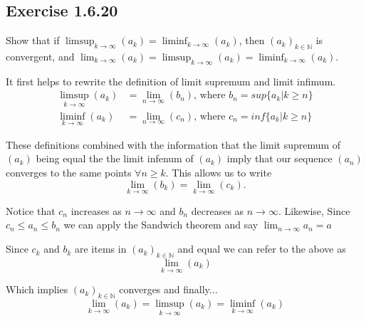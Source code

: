 \documentclass{tufte-book}
\theoremstyle{mytheoremstyle}
\theoremstyle{mylemstyle}
\theoremstyle{mydefstyle}
\begin{document}
\subsection{Exercise 1.6.20}
Show that if  $\limsup_{k \to \infty}(a_k) = \liminf_{k \to \infty}(a_k)$, then $(a_k)_{k \in \mathbb{N}}$ is convergent, and $\lim_{k \to \infty}(a_k) = \limsup_{k \to \infty}(a_k) = \liminf_{k \to \infty}(a_k)$.

It first helps to rewrite the definition of limit supremum and limit infimum.
\begin{align*}
	\limsup_{k \to \infty}(a_k) &= \lim_{n \to \infty}(b_n) \text{, where } b_n = sup\{a_k | k \geq n\} \\
    \liminf_{k \to \infty}(a_k) &= \lim_{n \to \infty}(c_n) \text{, where } c_n = inf\{a_k| k \geq n\}
\end{align*}

These definitions combined with the information that the limit supremum of $(a_k)$ being equal the the limit infenum of $(a_k)$ imply that our sequence $(a_n)$ converges to the same points $\forall n \geq k$. This allows us to write
\[\lim_{k \to \infty}(b_k) = \lim_{k \to \infty}(c_k). \] 

Notice that $c_n$ increases as $n \to \infty$ and $b_n$ decreases as $n \to \infty$.
Likewise, Since $c_n \leq a_n \leq b_n$ we can apply the Sandwich theorem and say $\lim_{n \to \infty}a_n = a$ 

Since $c_k$ and $b_k$ are items in $(a_k)_{k \in \mathbb{N}}$ and equal we can refer to the above as 
\[\lim_{k \to \infty}(a_k)\] 

  Which implies $(a_k)_{k \in \mathbb{N}}$ converges and finally...
\[\lim_{k \to \infty}(a_k) = \limsup_{k \to \infty}(a_k) = \liminf_{k \to \infty}(a_k) \]
\end{document}
